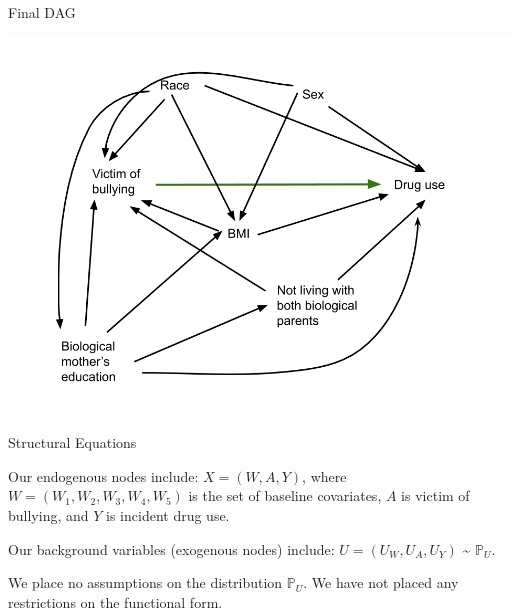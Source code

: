 \documentclass[ignorenonframetext,]{beamer}
\begin{document}
\begin{frame}{Final DAG}

\includegraphics[width=1\linewidth]{DAG Causal Final Project_reduced covariates}

\end{frame}

\begin{frame}{Structural Equations}

Our endogenous nodes include: \(X = (W, A, Y)\), where
\(W = (W_1, W_2, W_3, W_4, W_5)\) is the set of baseline covariates,
\(A\) is victim of bullying, and \(Y\) is incident drug use.

\vspace{12pt}

Our background variables (exogenous nodes) include:
\(U = (U_W, U_A, U_Y)\) \textasciitilde{} \(\mathbb{P}_U\).

\vspace{12pt}

We place no assumptions on the distribution \(\mathbb{P}_U\). We have
not placed any restrictions on the functional form.

\end{frame}
\end{document}
